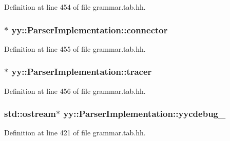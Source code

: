 Definition at line 454 of file grammar.tab.hh.

\hypertarget{classyy_1_1_parser_implementation_a678bb517350badcd5d5f5e1aa7c9aa46}{
\subsubsection[{connector}]{$\ast$ {\bf yy::ParserImplementation::connector}}}
\label{classyy_1_1_parser_implementation_a678bb517350badcd5d5f5e1aa7c9aa46}


Definition at line 455 of file grammar.tab.hh.

\hypertarget{classyy_1_1_parser_implementation_a829e14b2eb8ba321cd237e6f3316a0e9}{
\subsubsection[{tracer}]{$\ast$ {\bf yy::ParserImplementation::tracer}}}
\label{classyy_1_1_parser_implementation_a829e14b2eb8ba321cd237e6f3316a0e9}


Definition at line 456 of file grammar.tab.hh.

\hypertarget{classyy_1_1_parser_implementation_a2e23f250bc33f4a75dbc1acec6966a5b}{
\subsubsection[{yycdebug\_\-}]{\setlength{\rightskip}{0pt plus 5cm}std::ostream$\ast$ {\bf yy::ParserImplementation::yycdebug\_\-}}}
\label{classyy_1_1_parser_implementation_a2e23f250bc33f4a75dbc1acec6966a5b}


Definition at line 421 of file grammar.tab.hh.

